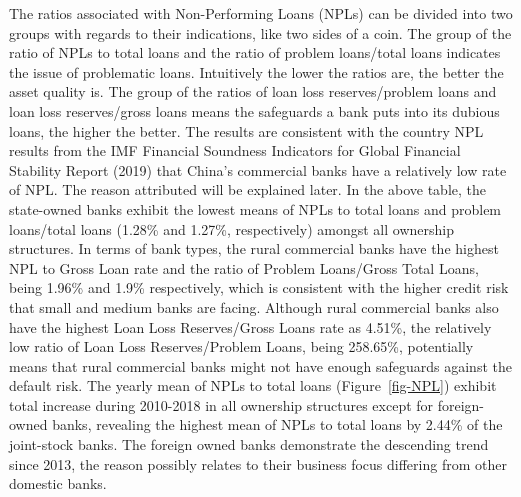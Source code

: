 \documentclass[
  12pt,
  a4paper,
]{scrreprt}
\begin{document}
{{{{The ratios associated with Non-Performing Loans (NPLs) can be divided
into two groups with regards to their indications, like two sides of a
coin. The group of the ratio of NPLs to total loans and the ratio of
problem loans/total loans indicates the issue of problematic loans.
Intuitively the lower the ratios are, the better the asset quality is.
The group of the ratios of loan loss reserves/problem loans and loan
loss reserves/gross loans means the safeguards a bank puts into its
dubious loans, the higher the better. The results are consistent with
the country NPL results from the IMF Financial Soundness Indicators for
Global Financial Stability Report (2019) that China's commercial banks
have a relatively low rate of NPL. The reason attributed will be
explained later. In the above table, the state-owned banks exhibit the
lowest means of NPLs to total loans and problem loans/total loans
(1.28\% and 1.27\%, respectively) amongst all ownership structures. In
terms of bank types, the rural commercial banks have the highest NPL to
Gross Loan rate and the ratio of Problem Loans/Gross Total Loans, being
1.96\% and 1.9\% respectively, which is consistent with the higher
credit risk that small and medium banks are facing. Although rural
commercial banks also have the highest Loan Loss Reserves/Gross Loans
rate as 4.51\%, the relatively low ratio of Loan Loss Reserves/Problem
Loans, being 258.65\%, potentially means that rural commercial banks
might not have enough safeguards against the default risk. The yearly
mean of NPLs to total loans (Figure~\ref{fig-NPL}) exhibit total
increase during 2010-2018 in all ownership structures except for
foreign-owned banks, revealing the highest mean of NPLs to total loans
by 2.44\% of the joint-stock banks. The foreign owned banks demonstrate
the descending trend since 2013, the reason possibly relates to their
business focus differing from other domestic banks.

\begin{figure}

\end{figure}}}}}
\end{document}
